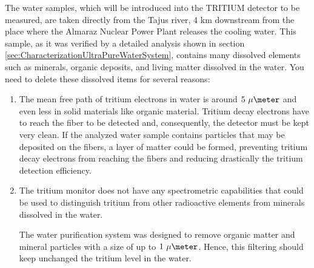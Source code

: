 The water samples, which will be introduced into the TRITIUM detector to be measured, are taken directly from the Tajus river, 4 km downstream from the place where the Almaraz Nuclear Power Plant releases the cooling water. This sample, as it was verified by a detailed analysis shown in section \ref{sec:CharacterizationUltraPureWaterSystem}, contains many dissolved elements such as minerals, organic deposits, and living matter dissolved in the water. You need to delete these dissolved items for several reasons:


\begin{enumerate}

\item{} The mean free path of tritium electrons in water is around $5~\mu\meter$ and even less in solid materials like organic material. Tritium decay electrons have to reach the fiber to be detected and, consequently, the detector must be kept very clean. If the analyzed water sample contains particles that may be deposited on the fibers, a layer of matter could be formed, preventing tritium decay electrons from reaching the fibers and reducing drastically the tritium detection efficiency.

\item{} The tritium monitor does not have any spectrometric capabilities that could be used to distinguish tritium from other radioactive elements from minerals dissolved in the water.

The water purification system was designed to remove organic matter and mineral particles with a size of up to $1~\mu\meter$. Hence, this filtering should keep unchanged the tritium level in the water. 


\end{enumerate}

